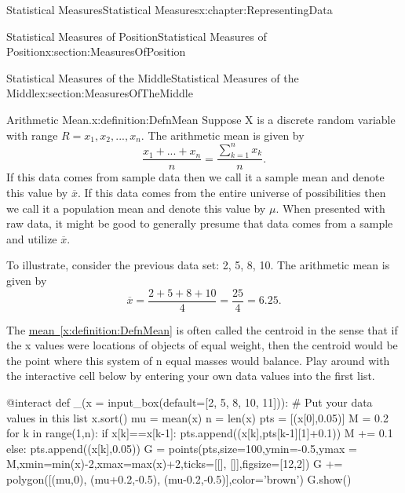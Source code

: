 \documentclass[oneside,10pt,]{book}
\newcommand{\xreffont}{\relax}
\numberwithin{equation}{section}
\begin{document}
\begin{chapterptx}{Statistical Measures}{}{Statistical Measures}{}{}{x:chapter:RepresentingData}
\begin{sectionptx}{Statistical Measures of Position}{}{Statistical Measures of Position}{}{}{x:section:MeasuresOfPosition}
\end{sectionptx}
%
%
\typeout{************************************************}
\typeout{************************************************}
%
\begin{sectionptx}{Statistical Measures of the Middle}{}{Statistical Measures of the Middle}{}{}{x:section:MeasuresOfTheMiddle}
\begin{definition}{Arithmetic Mean.}{x:definition:DefnMean}%
Suppose X is a discrete random variable with range \(R = {x_1, x_2, ..., x_n}\). The arithmetic mean is given by%
\begin{equation*}
\frac{x_1 + ... + x_n}{n} = \frac{\sum_{k=1}^n x_k}{n}.
\end{equation*}
If this data comes from sample data then we call it a sample mean and denote this value by \(\overline{x}\). If this data comes from the entire universe of possibilities then we call it a population mean and denote this value by \(\mu\).  When presented with raw data, it might be good to generally presume that data comes from a sample and utilize \(\overline{x}\).%
\end{definition}
To illustrate, consider the previous data set: \textbraceleft{}2, 5, 8, 10\textbraceright{}. The arithmetic mean is given by%
\begin{equation*}
\overline{x} = \frac{2+5+8+10}{4} = \frac{25}{4} = 6.25.
\end{equation*}
%
\par
The \hyperref[x:definition:DefnMean]{mean~{\xreffont\ref{x:definition:DefnMean}}} is often called the centroid in the sense that if the x values were locations of objects of equal weight, then the centroid would be the point where this system of n equal masses would balance. Play around with the interactive cell below by entering your own data values into the first list.%
\par
\leavevmode%
\begin{sageinput}
@interact
def _(x = input_box(default=[2, 5, 8, 10, 11])):     # Put your data values in this list
    x.sort()
    mu = mean(x)
    n = len(x)
    pts = [(x[0],0.05)]
    M = 0.2
    for k in range(1,n):
        if x[k]==x[k-1]:
            pts.append((x[k],pts[k-1][1]+0.1))
            M += 0.1
        else:
            pts.append((x[k],0.05))
    G = points(pts,size=100,ymin=-0.5,ymax = M,xmin=min(x)-2,xmax=max(x)+2,ticks=[[], []],figsize=[12,2])
    G += polygon([(mu,0), (mu+0.2,-0.5), (mu-0.2,-0.5)],color='brown')
    G.show()
\end{sageinput}

\end{sectionptx}
\end{chapterptx}
\end{document}

